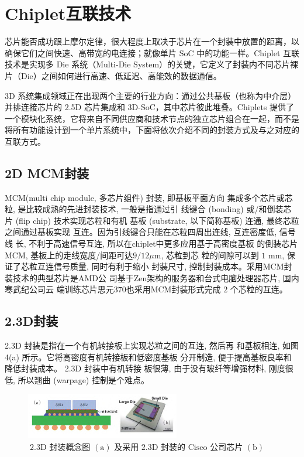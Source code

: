 \section{Chiplet互联技术}

芯片能否成功跟上摩尔定律，很大程度上取决于芯片在一个封装中放置的距离，以确保它们之间快速、高带宽的电连接；就像单片 SoC 中的功能一样。Chiplet 互联技术是实现多 Die 系统（Multi-Die System）的关键，它定义了封装内不同芯片裸片（Die）之间如何进行高速、低延迟、高能效的数据通信。

3D 系统集成领域正在出现两个主要的行业方向：通过公共基板（也称为中介层）并排连接芯片的 2.5D 芯片集成和 3D-SoC，其中芯片彼此堆叠。Chiplets 提供了一个模块化系统，它将来自不同供应商和技术节点的独立芯片组合在一起，而不是将所有功能设计到一个单片系统中，下面将依次介绍不同的封装方式及与之对应的互联方式。

\subsection{2D MCM封装}

MCM(multi chip module, 多芯片组件) 封装, 即基板平面方向
集成多个芯片或芯粒, 是比较成熟的先进封装技术, 一般是指通过引
线键合 (bonding) 或/和倒装芯片 (flip chip) 技术实现芯粒和有机
基板 (substrate, 以下简称基板) 连通, 最终芯粒之间通过基板实现
互连。因为引线键合只能在芯粒四周出连线, 互连密度低, 信号线
长, 不利于高速信号互连, 所以在chiplet中更多应用基于高密度基板
的倒装芯片MCM, 基板上的走线宽度/间距可达$9/12\mu\text{m}$, 芯粒到芯
粒的间隙可以到 $1\text{ mm}$, 保证了芯粒互连信号质量, 同时有利于缩小
封装尺寸, 控制封装成本。采用MCM封装技术的典型芯片是AMD公
司基于Zen架构的服务器和台式电脑处理器芯片, 国内寒武纪公司云
端训练芯片思元$370$也采用MCM封装形式完成 $2$ 个芯粒的互连。

\subsection{2.3D封装}

2.3D 封装是指在一个有机转接板上实现芯粒之间的互连, 然后再 和基板相连, 如图 4(a) 所示。它将高密度有机转接板和低密度基板 分开制造, 便于提高基板良率和降低封装成本。 2.3D 封装中有机转接 板很薄, 由于没有玻纤等增强材料, 刚度很低, 所以翘曲 (warpage) 控制是个难点。

\begin{figure}[htbp]
	\centering
	\includegraphics[width=0.6\textwidth]{img/3-2.jpg} %
	\caption{$ \ 2.3\text{D}$ 封装概念图 $(\text{a})$ 及采用 $2.3\text{D}$ 封装的 $\text{Cisco}$ 公司芯片 $(\text{b})$ \cite{Miki2019Development}}
	\label{fig:example}
\end{figure}

